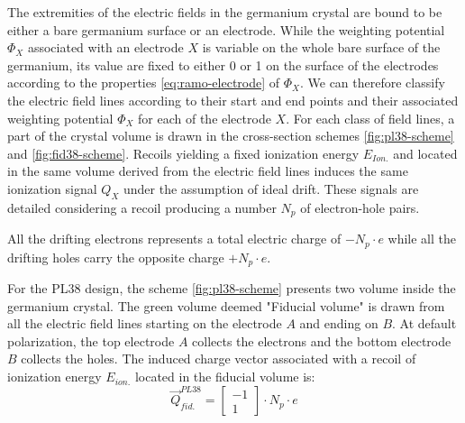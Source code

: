 The extremities of the electric fields in the germanium crystal are bound to be either a bare germanium surface or an electrode. While the weighting potential $\Phi_X$ associated with an electrode $X$ is variable on the whole bare surface of the germanium, its value are fixed to either 0 or 1 on the surface of the electrodes according to the properties \ref{eq:ramo-electrode} of $\Phi_X$. 
We can therefore classify the electric field lines according to their start and end points and their associated weighting potential $\Phi_X$ for each of the electrode $X$. For each class of field lines, a part of the crystal volume is drawn in the cross-section schemes \ref{fig:pl38-scheme} and \ref{fig:fid38-scheme}. Recoils yielding a fixed ionization energy $E_{Ion.}$ and located in the same volume derived from the electric field lines induces the same ionization signal $Q_X$ under the assumption of ideal drift. These signals are detailed considering a recoil producing a number $N_p$ of electron-hole pairs.

All the drifting electrons represents a total electric charge of $- N_p \cdot e$ while all the drifting holes carry the opposite charge $+ N_p \cdot e$.

%
%
%

For the PL38 design, the scheme \ref{fig:pl38-scheme} presents two volume inside the germanium crystal. The green volume deemed "Fiducial volume" is drawn from all the electric field lines starting on the electrode $A$ and ending on $B$. At default polarization, the top electrode $A$ collects the electrons and the bottom electrode $B$ collects the holes. The induced charge vector associated with a recoil of ionization energy $E_{ion.}$ located in the fiducial volume is:
\begin{equation}
\label{eq:pl38-induced-charges}
\vec{Q}_{fid.}^{PL38} =
\begin{bmatrix}
-1 \\ 1
\end{bmatrix}
\cdot N_p \cdot e
\end{equation}

